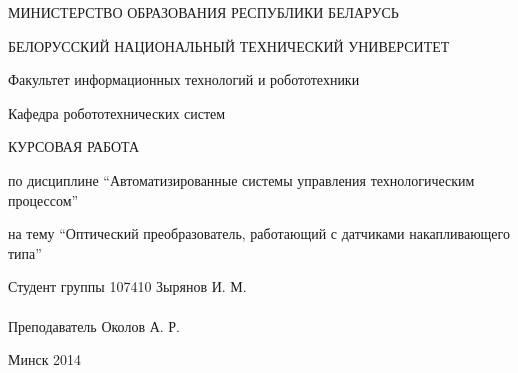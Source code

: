 \begin{titlepage} %

\thispagestyle{empty} %

\begin{center}
МИНИСТЕРСТВО ОБРАЗОВАНИЯ РЕСПУБЛИКИ БЕЛАРУСЬ

БЕЛОРУССКИЙ НАЦИОНАЛЬНЫЙ ТЕХНИЧЕСКИЙ УНИВЕРСИТЕТ

Факультет информационных технологий и робототехники

Кафедра робототехнических систем
\end{center}

\vfill

\begin{center}
    \large{КУРСОВАЯ РАБОТА}

    \normalsize{по дисциплине ``Автоматизированные системы управления технологическим процессом''}

    \normalsize{на тему ``Оптический преобразователь, работающий с датчиками накапливающего типа''}
\end{center}

\vfill

\noindent
Студент группы 107410 \hfill Зырянов И. М.
\\
\\
\noindent
Преподаватель \hfill Околов А. Р.

\vfill

\centerline{Минск 2014}

\clearpage %

\end{titlepage}
